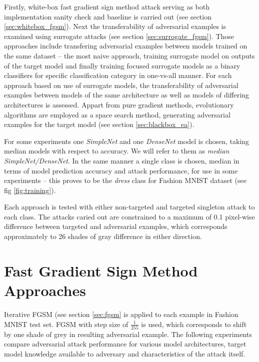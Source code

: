 Firstly, white-box fast gradient sign method attack serving as both implementation sanity check and baseline is carried out (see section \ref{sec:whitebox_fgsm}). Next the transferability of adversarial examples is examined using surrogate attacks (see section \ref{sec:surrogate_fgsm}). Those approaches include transfering adversarial examples between models trained on the same dataset -- the most naive approach, training surrogate model on outputs of the target model and finally training focused surrogate models as a binary classifiers for specific classification category in one-vs-all manner. For each approach based on use of surrogate models, the transferability of adversarial examples between models of the same architecture as well as models of differing architectures is assessed. Appart from pure gradient methods, evolutionary algorithms are employed as a space search method, generating adversarial examples for the target model (see section \ref{sec:blackbox_ea}).

For some experiments one \emph{SimpleNet} and one \emph{DenseNet} model is chosen, taking median models with respect to accuracy. We will refer to them as \emph{median SimpleNet/DenseNet}. In the same manner a single class is chosen, median in terms of model prediction accuracy and attack performance, for use in some experiments -- this proves to be the \emph{dress} class for Fashion MNIST dataset (see fig \ref{fig:training}).

Each approach is tested with either non-targeted and targeted singleton attack to each class. The attacks caried out are constrained to a maximum of 0.1 pixel-wise difference between targeted and adversarial examples, which corresponds approximately to 26 shades of gray difference in either direction.

\section{Fast Gradient Sign Method Approaches}
Iterative FGSM (see section \ref{sec:fgsm} is applied to each example in Fashion MNIST test set. FGSM with step size of $\frac{1}{255}$ is used, which corresponds to shift by one shade of grey in resulting adversarial example. The following experiments compare adversarial attack performance for various model architectures, target model knowledge available to adversary and characteristics of the attack itself.

